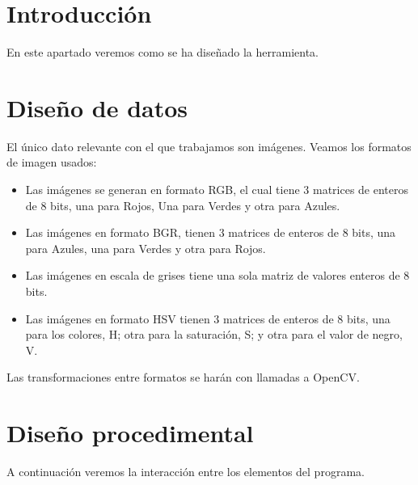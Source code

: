 
\section{Introducción}
En este apartado veremos como se ha diseñado la herramienta. 

\section{Diseño de datos}
El único dato relevante con el que trabajamos son imágenes. Veamos los formatos de imagen usados:


\begin{itemize}
	\item Las imágenes se generan en formato RGB, el cual tiene 3 matrices de enteros de 8 bits, una para Rojos, Una para Verdes y otra para Azules.
	
	\item Las imágenes en formato BGR, tienen 3 matrices de enteros de 8 bits, una para Azules, una para Verdes y otra para Rojos.
	
	\item Las imágenes en escala de grises tiene una sola matriz de valores enteros de 8 bits.
	
	\item Las imágenes en formato HSV tienen 3 matrices de enteros de 8 bits, una para los colores, H; otra para la saturación, S; y otra para el valor de negro, V.
\end{itemize}

Las transformaciones entre formatos se harán con llamadas a OpenCV.


\section{Diseño procedimental}

A continuación veremos la interacción entre los elementos del programa.







